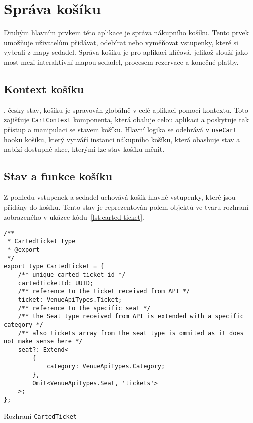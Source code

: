 \section{Správa košíku}
\label{sec:implementace-kosik}
Druhým hlavním prvkem této aplikace je správa nákupního košíku.
Tento prvek umožňuje uživatelům přidávat, odebírat nebo vyměňovat vstupenky, které si vybrali z mapy sedadel.
Správa košíku je pro aplikaci klíčová, jelikož slouží jako most mezi interaktivní mapou sedadel, procesem rezervace a konečné platby.

\subsection{Kontext košíku}
\label{subsec:implementace-kosik-kontext}
, česky stav, košíku je spravován globálně v celé aplikaci pomocí kontextu.
Toto zajišťuje \texttt{CartContext} komponenta, která obaluje celou aplikaci a poskytuje tak přístup a manipulaci se stavem košíku.
Hlavní logika se odehrává v \texttt{useCart} hooku košíku, který vytváří instanci nákupního košíku, která obashuje stav a nabízí dostupné akce, kterými lze stav košíku měnit.

\subsection{Stav a funkce košíku}
\label{subsec:implementace-kosik-stav}
Z pohledu vstupenek a sedadel uchovává košík hlavně vstupenky, které jsou přidány do košíku.
Tento stav je reprezentován polem objektů ve tvaru rozhraní zobrazeného v ukázce kódu~\ref{lst:carted-ticket}.

\begin{listing}[H]
\begin{verbatim}
/**
 * CartedTicket type
 * @export
 */
export type CartedTicket = {
	/** unique carted ticket id */
	cartedTicketId: UUID;
	/** reference to the ticket received from API */
	ticket: VenueApiTypes.Ticket;
	/** reference to the specific seat */
	/** the Seat type received from API is extended with a specific category */
	/** also tickets array from the seat type is ommited as it does not make sense here */
	seat?: Extend<
		{
			category: VenueApiTypes.Category;
		},
		Omit<VenueApiTypes.Seat, 'tickets'>
	>;
};
\end{verbatim}
\caption{Rozhraní \texttt{CartedTicket}}
\label{lst:carted-ticket}
\end{listing}

